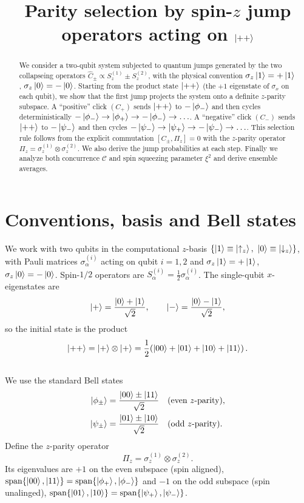 \documentclass[12pt,a4paper]{article}
\title{Parity selection by spin-$z$ jump operators acting on \texorpdfstring{$\ket{++}$}{|++>}}
\author{}
\date{}
\begin{document}
	\maketitle
	
	\begin{abstract}
		We consider a two-qubit system subjected to quantum jumps generated by the two collapseing operators
		\(
		\hat{C}_{\pm}\propto S_z^{(1)}\pm S_z^{(2)}
		\),
		with the physical convention
		\(\sigma_z\ket{1}=+\ket{1}\), \(\sigma_z\ket{0}=-\ket{0}\).
		Starting from the product state \(\ket{++}\) (the $+1$ eigenstate of \(\sigma_x\) on each qubit), we show that the first jump projects the system onto a definite $z$-parity subspace.
		A ``positive'' click \((C_+)\) sends \(\ket{++}\) to \(-\ket{\phi_-}\) and then cycles deterministically
		\(-\ket{\phi_-}\to \ket{\phi_+}\to -\ket{\phi_-}\to\ldots\). 
		A ``negative'' click \((C_-)\) sends \(\ket{++}\) to \(-\ket{\psi_-}\) and then cycles
		\(-\ket{\psi_-}\to \ket{\psi_+}\to -\ket{\psi_-}\to\ldots\).
		This selection rule follows from the explicit commutation \([C_{\pm},\Pi_z]=0\) with the $z$-parity operator \(\Pi_z=\sigma_z^{(1)}\otimes\sigma_z^{(2)}\).
		We also derive the jump probabilities at each step. Finally we analyze both concurrence $\mathcal C$ and spin squeezing parameter $\xi^2$ and derive ensemble averages.
	\end{abstract}
	
	\section{Conventions, basis and Bell states}
	We work with two qubits in the computational $z$-basis
	\(\{\ket{1}\equiv\ket{\uparrow_z},\ \ket{0}\equiv\ket{\downarrow_z}\}\),
	with Pauli matrices \(\sigma_\alpha^{(i)}\) acting on qubit \(i=1,2\) and
	\(\sigma_z\ket{1}=+\ket{1}\), \(\sigma_z\ket{0}=-\ket{0}\).
	Spin-$1/2$ operators are \(S_\alpha^{(i)}=\tfrac{1}{2}\sigma_\alpha^{(i)}\).
	The single-qubit $x$-eigenstates are
	\[
	\ket{+}=\frac{\ket{0}+\ket{1}}{\sqrt{2}},
	\qquad
	\ket{-}=\frac{\ket{0}-\ket{1}}{\sqrt{2}},
	\]
	so the initial state is the product
	\[
	\ket{++}=\ket{+}\otimes\ket{+}
	=\frac{1}{2}\!\left(\ket{00}+\ket{01}+\ket{10}+\ket{11}\right).
	\] \\
	We use the standard Bell states
	\begin{align}
		\ket{\phi_\pm}&=\frac{\ket{00}\pm\ket{11}}{\sqrt{2}}
		\quad(\text{even $z$-parity}),\\
		\ket{\psi_\pm}&=\frac{\ket{01}\pm\ket{10}}{\sqrt{2}}
		\quad(\text{odd $z$-parity}).
	\end{align}
	Define the $z$-parity operator
	\[
	\Pi_z=\sigma_z^{(1)}\otimes\sigma_z^{(2)}.
	\]
	Its eigenvalues are \(+1\) on the even subspace (spin aligned), \(\mathrm{span}\{\ket{00},\ket{11}\}=\mathrm{span}\{\ket{\phi_+},\ket{\phi_-}\}\) and \(-1\) on the odd subspace (spin unalinged), \(\mathrm{span}\{\ket{01},\ket{10}\}=\mathrm{span}\{\ket{\psi_+},\ket{\psi_-}\}\).
	
\end{document}
